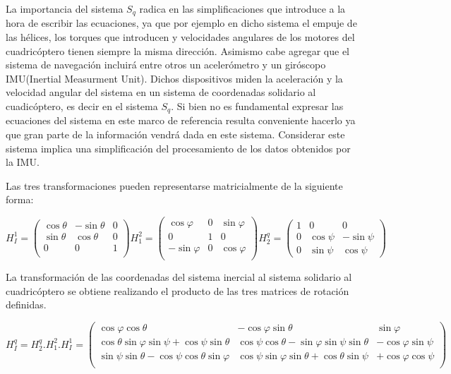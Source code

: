 \documentclass[main]{subfiles}
\begin{document}
La importancia del sistema $S_q$ radica en las simplificaciones que introduce a la hora de escribir las ecuaciones, ya que por ejemplo en dicho sistema el empuje de las h\'elices, los torques que introducen y velocidades angulares de los motores del cuadric\'optero tienen siempre la misma direcci\'on. Asimismo cabe agregar que el sistema de navegaci\'on incluir\'a entre otros un aceler\'ometro y un gir\'oscopo IMU(Inertial Measurment Unit). Dichos dispositivos miden la aceleraci\'on y la velocidad angular del sistema en un sistema de coordenadas solidario al cuadic\'optero, es decir en el sistema $S_q$. Si bien no es fundamental expresar las ecuaciones del sistema en este marco de referencia resulta conveniente hacerlo ya que gran parte de la informaci\'on vendr\'a dada en este sistema. Considerar este sistema implica una simplificaci\'on del procesamiento de los datos obtenidos por la IMU. 

Las tres transformaciones pueden representarse matricialmente de la siguiente forma: 

$$
H_I^1=\left(\begin{array}{ccc}
  \cos\theta&-\sin\theta&0\\
  \sin\theta&\cos\theta&0\\
  0&0&1\\
  \end{array}\right)   H_1^2=\left(\begin{array}{ccc}
  \cos\varphi&0& \sin\varphi\\
  0&1&0\\
  -\sin\varphi&0&\cos\varphi\\
  
  \end{array}\right)  H_2^q=\left(\begin{array}{ccc}
   1&0&0\\  
  0&\cos\psi&-\sin\psi\\
  0&\sin\psi&\cos\psi  
  
  \end{array}\right) 
$$



La transformaci\'on de las coordenadas del sistema inercial al sistema solidario al cuadric\'optero se obtiene realizando el producto de las tres matrices de rotaci\'on definidas.

\begin{footnotesize}
$$
H_I^q=H_2^q.H_1^2.H_I^1=\left(\begin{array}{ccc}
\cos\varphi\cos\theta& -\cos\varphi\sin\theta& \sin\varphi\\
 \cos\theta\sin\varphi\sin\psi +\cos\psi\sin\theta &\cos \psi \cos \theta- \sin\varphi\sin\psi\sin\theta& -\cos\varphi\sin\psi\\
\sin\psi\sin\theta - \cos\psi\cos\theta\sin\varphi&  \cos\psi\sin\varphi\sin\theta+ \cos\theta\sin\psi & +\cos\varphi\cos\psi\\
\end{array} \right)
$$
\end{footnotesize}
 
\end{document}

